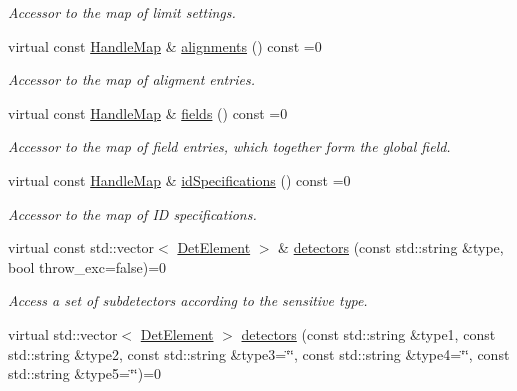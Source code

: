 \begin{DoxyCompactItemize}
\begin{DoxyCompactList}\small\item\em Accessor to the map of limit settings. \end{DoxyCompactList}\item 
virtual const \hyperlink{class_d_d4hep_1_1_geometry_1_1_l_c_d_d_a05cb11e7355772c7b0794bcca59bf477}{Handle\+Map} \& \hyperlink{class_d_d4hep_1_1_geometry_1_1_l_c_d_d_a48553ea87301f9eb1237e41e7e2a0f16}{alignments} () const =0
\begin{DoxyCompactList}\small\item\em Accessor to the map of aligment entries. \end{DoxyCompactList}\item 
virtual const \hyperlink{class_d_d4hep_1_1_geometry_1_1_l_c_d_d_a05cb11e7355772c7b0794bcca59bf477}{Handle\+Map} \& \hyperlink{class_d_d4hep_1_1_geometry_1_1_l_c_d_d_af2622f438504300116fabfa214b23be5}{fields} () const =0
\begin{DoxyCompactList}\small\item\em Accessor to the map of field entries, which together form the global field. \end{DoxyCompactList}\item 
virtual const \hyperlink{class_d_d4hep_1_1_geometry_1_1_l_c_d_d_a05cb11e7355772c7b0794bcca59bf477}{Handle\+Map} \& \hyperlink{class_d_d4hep_1_1_geometry_1_1_l_c_d_d_a16ddadf18c24ad54b816354107338a80}{id\+Specifications} () const =0
\begin{DoxyCompactList}\small\item\em Accessor to the map of ID specifications. \end{DoxyCompactList}\item 
virtual const std\+::vector$<$ \hyperlink{class_d_d4hep_1_1_geometry_1_1_det_element}{Det\+Element} $>$ \& \hyperlink{class_d_d4hep_1_1_geometry_1_1_l_c_d_d_a0f8e72265d7c6fd7d0dcdd293e13031f}{detectors} (const std\+::string \&type, bool throw\+\_\+exc=false)=0
\begin{DoxyCompactList}\small\item\em Access a set of subdetectors according to the sensitive type. \end{DoxyCompactList}\item 
virtual std\+::vector$<$ \hyperlink{class_d_d4hep_1_1_geometry_1_1_det_element}{Det\+Element} $>$ \hyperlink{class_d_d4hep_1_1_geometry_1_1_l_c_d_d_aee911f853a0e585f0ac9be7852ed6954}{detectors} (const std\+::string \&type1, const std\+::string \&type2, const std\+::string \&type3=\char`\"{}\char`\"{}, const std\+::string \&type4=\char`\"{}\char`\"{}, const std\+::string \&type5=\char`\"{}\char`\"{})=0

\end{DoxyCompactItemize}
